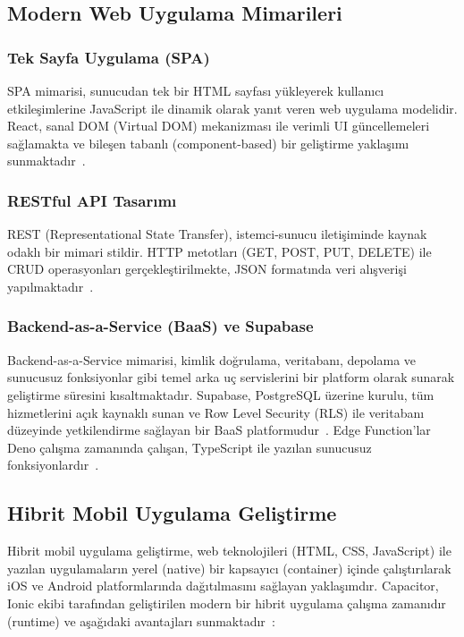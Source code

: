 \subsection{Modern Web Uygulama Mimarileri}

\subsubsection{Tek Sayfa Uygulama (SPA)}
SPA mimarisi, sunucudan tek bir HTML sayfası yükleyerek kullanıcı etkileşimlerine JavaScript ile dinamik olarak yanıt veren web uygulama modelidir. React, sanal DOM (Virtual DOM) mekanizması ile verimli UI güncellemeleri sağlamakta ve bileşen tabanlı (component-based) bir geliştirme yaklaşımı sunmaktadır~\cite{React2024}.

\subsubsection{RESTful API Tasarımı}
REST (Representational State Transfer), istemci-sunucu iletişiminde kaynak odaklı bir mimari stildir. HTTP metotları (GET, POST, PUT, DELETE) ile CRUD operasyonları gerçekleştirilmekte, JSON formatında veri alışverişi yapılmaktadır~\cite{Fielding2000}.

\subsubsection{Backend-as-a-Service (BaaS) ve Supabase}
Backend-as-a-Service mimarisi, kimlik doğrulama, veritabanı, depolama ve sunucusuz fonksiyonlar gibi temel arka uç servislerini bir platform olarak sunarak geliştirme süresini kısaltmaktadır. Supabase, PostgreSQL üzerine kurulu, tüm hizmetlerini açık kaynaklı sunan ve Row Level Security (RLS) ile veritabanı düzeyinde yetkilendirme sağlayan bir BaaS platformudur~\cite{Supabase2024}. Edge Function'lar Deno çalışma zamanında çalışan, TypeScript ile yazılan sunucusuz fonksiyonlardır~\cite{Deno2024}.

\subsection{Hibrit Mobil Uygulama Geliştirme}

Hibrit mobil uygulama geliştirme, web teknolojileri (HTML, CSS, JavaScript) ile yazılan uygulamaların yerel (native) bir kapsayıcı (container) içinde çalıştırılarak iOS ve Android platformlarında dağıtılmasını sağlayan yaklaşımdır. Capacitor, Ionic ekibi tarafından geliştirilen modern bir hibrit uygulama çalışma zamanıdır (runtime) ve aşağıdaki avantajları sunmaktadır~\cite{Capacitor2024}:

